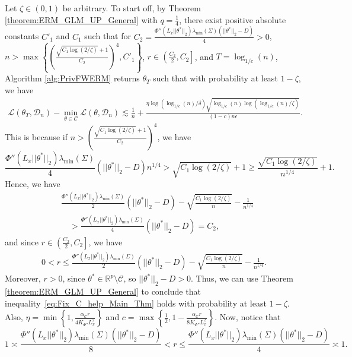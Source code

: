 \documentclass{article}
\begin{document}
Let $\zeta \in (0, 1)$ be arbitrary. To start off, by Theorem \ref{theorem:ERM_GLM_UP_General} with $q = \frac{1}{4}$, there exist positive absolute constants $C'_1$ and $C_1$ such that for $C_2 = \frac{\Phi''(L_x||\theta^*||_2)\lambda_{\min}(\Sigma)(||\theta^*||_2 - D)}{4} > 0$, $n > \max\left\{\left(\frac{\sqrt{C_1\log(2/\zeta)} + 1}{C_2}\right)^{4}, C'_1\right\}$, $r \in\left(\frac{C_2}{2}, C_2\right]$, and $T = \log_{1/c}(n)$, Algorithm \ref{alg:PrivFWERM} returns $\theta_T$ such that with probability at least $1 - \zeta$, we have
\begin{align}
\label{eq:Fix_C_help_Main_Thm}
\mathcal{L}(\theta_T, \mathcal{D}_n) - \mathop{\min}\limits_{\theta \in \mathcal{C}}\mathcal{L}(\theta, \mathcal{D}_n) \lesssim \frac{1}{n} + \frac{\eta\log\left(\log_{1/c}(n)/\delta\right)\sqrt{\log_{1/c}(n)\log\left(\log_{1/c}(n)/\zeta\right)}}{(1 - c)n\epsilon}.
\end{align}
This is because if $n > \left(\frac{\sqrt{C_1\log(2/\zeta)} + 1}{C_2}\right)^{4}$, we have $$\frac{\Phi''(L_x||\theta^*||_2)\lambda_{\min}(\Sigma)}{4}(||\theta^*||_2 - D)n^{1/4} > \sqrt{C_1\log(2/\zeta)} + 1 \geq \frac{\sqrt{C_1\log(2/\zeta)}}{n^{1/4}} + 1.$$ Hence, we have
\begin{align*}
&\frac{\Phi''(L_x||\theta^*||_2)\lambda_{\min}(\Sigma)}{2}(||\theta^*||_2 - D) - \sqrt{\frac{C_1\log(2/\zeta)}{n}} - \frac{1}{n^{1/4}}\\
& \quad > \frac{\Phi''(L_x||\theta^*||_2)\lambda_{\min}(\Sigma)}{4}(||\theta^*||_2 - D) = C_2,
\end{align*}
and since $r \in\left(\frac{C_2}{2}, C_2\right]$, we have 
\begin{align*}
0 < r \leq \frac{\Phi''(L_x||\theta^*||_2)\lambda_{\min}(\Sigma)}{2}(||\theta^*||_2 - D) - \sqrt{\frac{C_1\log(2/\zeta)}{n}} - \frac{1}{n^{1/4}}.
\end{align*}
Moreover, $r > 0$, since $\theta^* \in \mathbb{R}^p \setminus \mathcal{C}$, so $||\theta^*||_2 - D > 0$. Thus, we can use Theorem \ref{theorem:ERM_GLM_UP_General} to conclude that inequality~\eqref{eq:Fix_C_help_Main_Thm} holds with probability at least $1 - \zeta$. Also, $\eta = \min\left\{1, \frac{\alpha_{\mathcal{C}}r}{4K_{\Phi''}L_x^2}\right\}$ and $c = \max\left\{\frac{1}{2}, 1 - \frac{\alpha_{\mathcal{C}}r}{8K_{\Phi''}L_x^2}\right\}$. Now, notice that
$$1 \asymp \frac{\Phi''(L_x||\theta^*||_2)\lambda_{\min}(\Sigma)(||\theta^*||_2 - D)}{8} < r \leq \frac{\Phi''(L_x||\theta^*||_2)\lambda_{\min}(\Sigma)(||\theta^*||_2 - D)}{4} \asymp 1.$$
\end{document}
